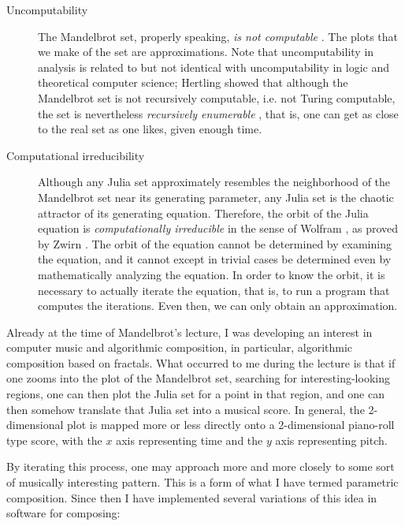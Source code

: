 \documentclass[11pt]{amsart}
\begin{document}
\begin{description}
\item[Uncomputability] The Mandelbrot set, properly speaking, \emph{is not computable} \cite{blum1993godel}. The plots that we make of the set are approximations. Note that uncomputability in analysis is related to but not identical with uncomputability in logic and theoretical computer science; Hertling showed that although the  Mandelbrot set is not recursively computable, i.e. not Turing computable, the set is nevertheless \emph{recursively enumerable} \cite{Hertling2005-HERITM-3}, that is, one can get as close to the real set as one likes, given enough time.
\item[Computational irreducibility] Although any Julia set approximately resembles the neighborhood of the Mandelbrot set near its generating parameter, any Julia set is the chaotic attractor of its generating equation. Therefore, the orbit of the Julia equation is \emph{computationally irreducible} in the sense of Wolfram \cite{wolfram1985undecidability}, as proved by Zwirn \cite{zwirn2015computational}. The orbit of the equation cannot be determined by examining the equation, and it cannot except in trivial cases be determined even by mathematically analyzing the equation. In order to know the orbit, it is necessary to actually iterate the equation, that is, to run a program that computes the iterations. Even then, we can only obtain an approximation.
\end{description}

Already at the time of Mandelbrot's lecture, I was developing an interest in computer music and algorithmic composition, in particular, algorithmic composition based on fractals. What occurred to me during the lecture is that if one zooms into the plot of the Mandelbrot set, searching for interesting-looking regions, one can then plot the Julia set for a point in that region, and one can then somehow translate that Julia set into a musical score. In general, the 2-dimensional plot is mapped more or less directly onto a 2-dimensional piano-roll type score, with the $x$ axis representing time and the $y$ axis representing pitch.

By iterating this process, one may approach more and more closely to some sort of musically interesting pattern. This is a form of what I have termed parametric composition. Since then I have implemented several variations of this idea in software for composing:
\end{document}
